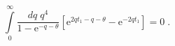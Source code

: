 \begin{equation}
\label{3-10}
\int\limits_0^\infty \frac{dq\;q^4}{1 - \mathrm{e}^{-q-\theta}}\left[
\mathrm{e}^{2qt_1 - q - \theta} - \mathrm{e}^{-2qt_1}\right] = 0\;.
\end{equation}

